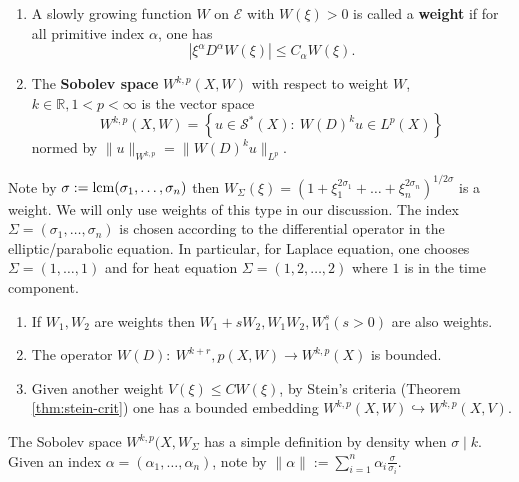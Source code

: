 \begin{definition}
\begin{enumerate}
\item A slowly growing function \(W\) on \(\mathcal{E}\) with \(W(\xi)>0\) is called a
\textbf{weight} if for all primitive index \(\alpha\), one has
\[
   \left|\xi^\alpha D^\alpha W(\xi)\right|\leq C_\alpha W(\xi).
   \]
\item The \textbf{Sobolev space} \(W^{k,p}(X,W)\) with respect to weight \(W\), \(k\in
   \mathbb{R}, 1<p<\infty\) is the vector space
\[
    W^{k,p}(X,W) = \left\{ u\in \mathcal{S}^*(X):\ W(D)^k u \in L^p(X)\right\}
   \]
normed by \(\|u\|_{W^{k,p}} = \| W(D)^k u\|_{L^p}\).
\end{enumerate}
\end{definition}

\begin{exampl}[Weight given by \( \Sigma=(\sigma_1,\dots, \sigma_n) \)]
Note by \(\sigma:= \mathop{\rm lcm}\nolimits(\sigma_1,\dots,\sigma_n)\) then \(W_\Sigma(\xi) = \left( 1 +
\xi_1^{2\sigma_1} + \dots + \xi_n^{2\sigma_n} \right)^{1/2\sigma}\) is a weight. We will
only use weights of this type in our discussion. The index \(\Sigma =
(\sigma_1,\dots,\sigma_n)\) is chosen according to the differential operator in the
elliptic/parabolic equation. In particular, for Laplace equation, one chooses \(\Sigma=(1,\dots, 1)\) and for heat equation \(\Sigma = (1,2,\dots, 2)\) where \(1\)
is in the time component.
\end{exampl}

\begin{remark}
\label{rem:weight}
\begin{enumerate}
\item If \(W_1,W_2\) are weights then \(W_1 + s W_2, W_1 W_2, W_1^s (s>0)\) are also weights.
\item The operator \(W(D):\ W^{k+r},p(X,W) \longrightarrow W^{k,p}(X)\) is bounded.
\item Given another weight \(V(\xi) \leq C W(\xi)\), by Stein's criteria (Theorem
\ref{thm:stein-crit}) one has a bounded embedding \(W^{k,p}(X,W) \hookrightarrow  W^{k,p}(X,V)\).
\end{enumerate}
\end{remark}

The Sobolev space \(W^{k,p}(X,W_\Sigma\) has a simple definition by density when \(\sigma \mid
k\). Given an index \(\alpha = (\alpha_1,\dots,\alpha_n)\), note by
\(\|\alpha\| := \sum_{i=1}^n \alpha_i \frac{\sigma}{\sigma_i}.\)

